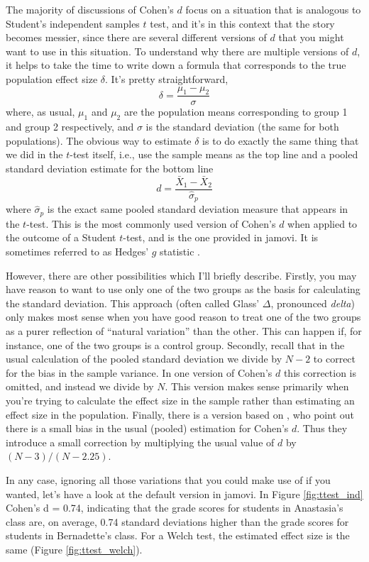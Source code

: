 The majority of discussions of Cohen's $d$ focus on a situation that is analogous to Student's independent samples $t$ test, and it's in this context that the story becomes messier, since there are several different versions of $d$ that you might want to use in this situation. To understand why there are multiple versions of $d$, it helps to take the time to write down a formula that corresponds to the true population effect size $\delta$. It's pretty straightforward, 
$$
\delta = \frac{\mu_1 - \mu_2}{\sigma}
$$
where, as usual, $\mu_1$ and $\mu_2$ are the population means corresponding to group 1 and group 2 respectively, and $\sigma$ is the standard deviation (the same for both populations). The obvious way to estimate $\delta$ is to do exactly the same thing that we did in the $t$-test itself, i.e., use the sample means as the top line and a pooled standard deviation estimate for the bottom line
$$
d = \frac{\bar{X}_1 - \bar{X}_2}{\hat{\sigma}_p}
$$
where $\hat\sigma_p$ is the exact same pooled standard deviation measure that appears in the $t$-test. This is the most commonly used version of Cohen's $d$ when applied to the outcome of a Student $t$-test, and is the one provided in jamovi. It is sometimes referred to as Hedges' $g$ statistic \parencite{Hedges1981}. 

However, there are other possibilities which I'll briefly describe. Firstly, you may have reason to want to use only one of the two groups as the basis for calculating the standard deviation. This approach (often called Glass' $\Delta$, pronounced {\it delta}) only makes most sense when you have good reason to treat one of the two groups as a purer reflection of ``natural variation'' than the other. This can happen if, for instance, one of the two groups is a control group. Secondly, recall that in the usual calculation of the pooled standard deviation we divide by $N-2$ to correct for the bias in the sample variance. In one version of Cohen's $d$ this correction is omitted, and instead we divide by $N$. This version makes sense primarily when you're trying to calculate the effect size in the sample rather than estimating an effect size in the population. Finally, there is a version based on \textcite{Hedges1985}, who point out there is a small bias in the usual (pooled) estimation for Cohen's $d$. Thus they introduce a small correction by multiplying the usual value of $d$ by $(N-3)/(N-2.25)$. 

In any case, ignoring all those variations that you could make use of if you wanted, let's have a look at the default version in jamovi. In Figure \ref{fig:ttest_ind} Cohen's d = 0.74, indicating that the grade scores for students in Anastasia's class are, on average, 0.74 standard deviations higher than the grade scores for students in Bernadette's class. For a Welch test, the estimated effect size is the same (Figure \ref{fig:ttest_welch}).

